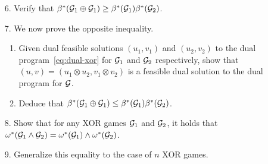 \begin{exercise}
\begin{enumerate}
\item[6.] Verify that $\beta^*(\mathcal{G}_1\oplus \mathcal{G}_1) \geq \beta^*(\mathcal{G}_1)\beta^*(\mathcal{G}_2)$. 
\item[7.] We now prove the opposite inequality. 
\begin{enumerate}
\item Given dual feasible solutions $(u_1,v_1)$ and $(u_2,v_2)$ to the dual program~\eqref{eq:dual-xor} for $\mathcal{G}_1$ and $\mathcal{G}_2$ respectively, show that $(u,v)=(u_1\otimes u_2, v_1\otimes v_2)$ is a feasible dual solution to the dual program for $\mathcal{G}$. 
\item Deduce that  $\beta^*(\mathcal{G}_1\oplus \mathcal{G}_1) \leq \beta^*(\mathcal{G}_1)\beta^*(\mathcal{G}_2)$. 
\end{enumerate}
\item[8.] Show that for any XOR games $\mathcal{G}_1$ and $\mathcal{G}_2$, it holds that $\omega^*(\mathcal{G}_1\wedge \mathcal{G}_2)=\omega^*(\mathcal{G}_1)\wedge\omega^*(\mathcal{G}_2)$. 
\item[9.] Generalize this equality to the case of $n$ XOR games. 
\end{enumerate}
\end{exercise}